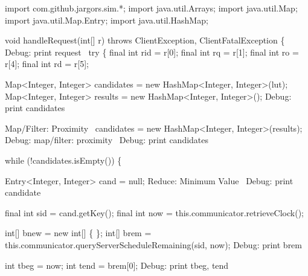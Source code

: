 \nwenddocs{}\endmoddef\nwstartdeflinemarkup{}\nwenddeflinemarkup
import com.github.jargors.sim.*;
import java.util.Arrays;
import java.util.Map;
import java.util.Map.Entry;
import java.util.HashMap;
\nwendcode{}\nwdocspar

\nwenddocs{}\endmoddef\nwstartdeflinemarkup{}\nwenddeflinemarkup
void handleRequest(int[] r) throws ClientException, ClientFatalException \{
  \LA{}Debug: print request~{\nwtagstyle{}}\RA{}
  try \{
    final int rid = r[0];
    final int rq  = r[1];
    final int ro  = r[4];
    final int rd  = r[5];

    Map<Integer, Integer> candidates = new HashMap<Integer, Integer>(lut);
    Map<Integer, Integer> results = new HashMap<Integer, Integer>();
    \LA{}Debug: print candidates~{\nwtagstyle{}}\RA{}

    \LA{}Map/Filter: Proximity~{\nwtagstyle{}}\RA{}
    candidates = new HashMap<Integer, Integer>(results);
    \LA{}Debug: map/filter: proximity~{\nwtagstyle{}}\RA{}
    \LA{}Debug: print candidates~{\nwtagstyle{}}\RA{}

    while (!candidates.isEmpty()) \{

      Entry<Integer, Integer> cand = null;
      \LA{}Reduce: Minimum Value~{\nwtagstyle{}}\RA{}
      \LA{}Debug: print candidate~{\nwtagstyle{}}\RA{}

      final int sid = cand.getKey();
      final int now = this.communicator.retrieveClock();

      int[] bnew = new int[] \{ \};
      int[] brem = this.communicator.queryServerScheduleRemaining(sid, now);
      \LA{}Debug: print brem~{\nwtagstyle{}}\RA{}

      int tbeg = now;
      int tend = brem[0];
      \LA{}Debug: print tbeg, tend~{\nwtagstyle{}}\RA{}

